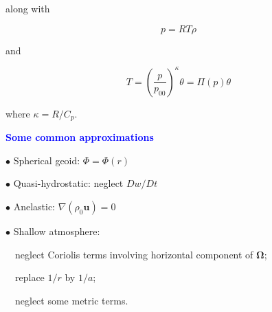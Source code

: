 \documentclass[a4]{seminar}
\newcommand{\B}[1]{\textcolor{blue}{#1}}
\begin{document}

\begin{slide}

along with

\begin{displaymath}
p = R T \rho
\end{displaymath}

\vspace{2mm}

and

\begin{displaymath}
T = \left( \frac{p}{p_{00}} \right)^\kappa \theta
= \Pi (p) \theta
\end{displaymath}

\vspace{2mm}

where \( \kappa = R / C_p \).


\end{slide}


\begin{slide}

\B{\bf Some common approximations}

\vspace{6mm}

\( \bullet \) Spherical geoid: \( \Phi = \Phi(r) \)

\vspace{2mm}

\( \bullet \) Quasi-hydrostatic: neglect \( Dw/Dt\)

\vspace{2mm}

\( \bullet \) Anelastic: \( \nabla ( \rho_0 \mathbf{u}) = 0 \) 

\vspace{2mm}

\( \bullet \) Shallow atmosphere: 

\ \ neglect Coriolis terms involving horizontal component of \( \boldsymbol{\Omega} \);

\ \ replace \( 1/r \) by \( 1/a \);

\ \ neglect some metric terms.



\end{slide}

\end{document}
